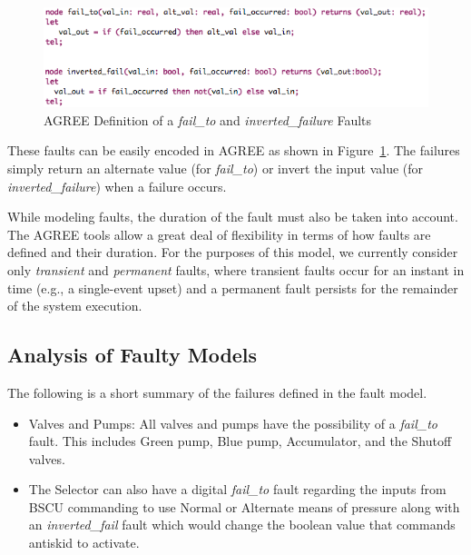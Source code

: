 \begin{figure}[h!]
  \centering
 \includegraphics[width=1\textwidth]{images/failureNodes.png}
  \vspace{-0.1in}
  \caption{AGREE Definition of a \textit{fail\_to} and \textit{inverted\_failure} Faults}
  \label{fig:failureNodes}
\end{figure}

These faults can be easily encoded in AGREE as shown in Figure~\ref{fig:failureNodes}.  The failures simply return an alternate value (for {\em fail\_to}) or invert the input value (for {\em inverted\_failure}) when a failure occurs.
 

While modeling faults, the duration of the fault must also be taken into account.  The AGREE tools allow a great deal of flexibility in terms of how faults are defined and their duration.  For the purposes of this model, we currently consider only {\em transient} and {\em permanent} faults, where transient faults occur for an instant in time (e.g., a single-event upset) and a permanent fault persists for the remainder of the system execution.


\subsection{Analysis of Faulty Models}
The following is a short summary of the failures defined in the fault model.

\begin{itemize}

\item Valves and Pumps: All valves and pumps have the possibility of a \textit{fail\_to} fault. This includes Green pump, Blue pump, Accumulator, and the Shutoff valves.

\item  The Selector can also have a digital \textit{fail\_to} fault regarding the inputs from BSCU commanding to use Normal or Alternate means of pressure along with an \textit{inverted\_fail} fault which would change the boolean value that commands antiskid to activate.

\end{itemize}

